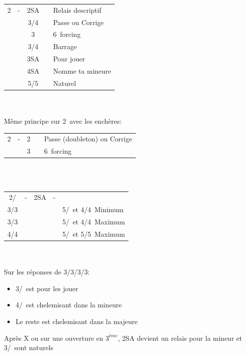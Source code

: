 \documentclass[a4paper, oneside, 11pt]{report}
\begin{document}
	\begin{tabular}{cccc|l}
	2\pique & - & 2SA && Relais descriptif\\
	&& 3\trefle/4\trefle && Passe ou Corrige\\
	&& 3\coeur && 6\coeur\ forcing\\
	&& 3\pique/4\pique && Barrage\\
	&& 3SA && Pour jouer\\
	&& 4SA && Nomme ta mineure\\
	&& 5\trefle/5\carreau && Naturel\\
	\end{tabular}\\\\
	
	Même principe sur 2\coeur\ avec les enchères:
	\begin{tabular}{cccc|l}
	2\coeur & - & 2\pique && Passe (doubleton) ou Corrige\\
	&& 3\pique && 6\pique\ forcing\\
	\end{tabular}\\\\

	\begin{tabular}{cccc|l}
	2\coeur/\pique & - & 2SA & - &\\
	3\trefle/3\carreau &&&& 5\coeur/\pique\ et 4\trefle/4\carreau\ Minimum\\
	3\coeur/3\pique &&&& 5\coeur/\pique\ et 4\trefle/4\carreau\ Maximum\\
	4\trefle/4\carreau &&&& 5\coeur/\pique\ et 5\trefle/5\carreau\ Maximum\\
	\end{tabular}\\\\
	
	Sur les réponses de 3\trefle/3\carreau/3\coeur/3\pique:
	\begin{itemize}
	\item 3\coeur/\pique\ est pour les jouer
	\item 4\trefle/\carreau\ est chelemisant dans la mineure
	\item Le reste est chelemisant dans la majeure\\
	\end{itemize}
	
	Après X ou sur une ouverture en $3^{ème}$, 2SA devient un relais pour la mineur et 3\trefle/\carreau\ sont naturels\\
\end{document}
